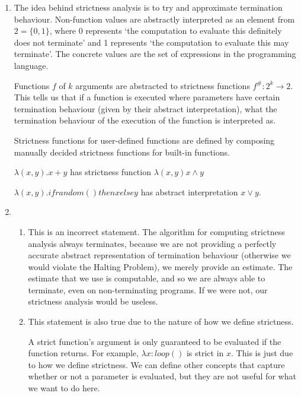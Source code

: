 


\begin{enumerate}[label=(\alph*)]
    \item
        The idea behind strictness analysis is to try and approximate termination behaviour. Non-function values are abstractly interpreted as an element from $2 = \{0,1\}$, where 0 represents `the computation to evaluate this definitely does not terminate' and 1 represents `the computation to evaluate this may terminate'. The concrete values are the set of expressions in the programming language.

        Functions $f$ of $k$ arguments are abstracted to strictness functions $f^{\#} : 2^k \rightarrow 2$. This tells us that if a function is executed where parameters have certain termination behaviour (given by their abstract interpretation), what the termination behaviour of the execution of the function is interpreted as.

        Strictness functions for user-defined functions are defined by composing manually decided strictness functions for built-in functions.

        $\lambda(x,y).x+y$ has strictness function $\lambda(x,y) x \wedge y$

        $\lambda(x,y). if random() then x else y$ has abstract interpretation $x \vee y$.

    \item
        \begin{enumerate}[label=(\roman*)]

            \item
                This is an incorrect statement. The algorithm for computing strictness analysis always terminates, because we are not providing a perfectly accurate abstract representation of termination behaviour (otherwise we would violate the Halting Problem), we merely provide an estimate. The estimate that we use is computable, and so we are always able to terminate, even on non-terminating programs. If we were not, our strictness analysis would be useless.

            \item
                This statement is also true due to the nature of how we define strictness.

                A strict function's argument is only guaranteed to be evaluated if the function returns. For example, $\lambda x: loop()$ is strict in $x$. This is just due to how we define strictness. We can define other concepts that capture whether or not a parameter is evaluated, but they are not useful for what we want to do here.


\end{enumerate}
\end{enumerate}
